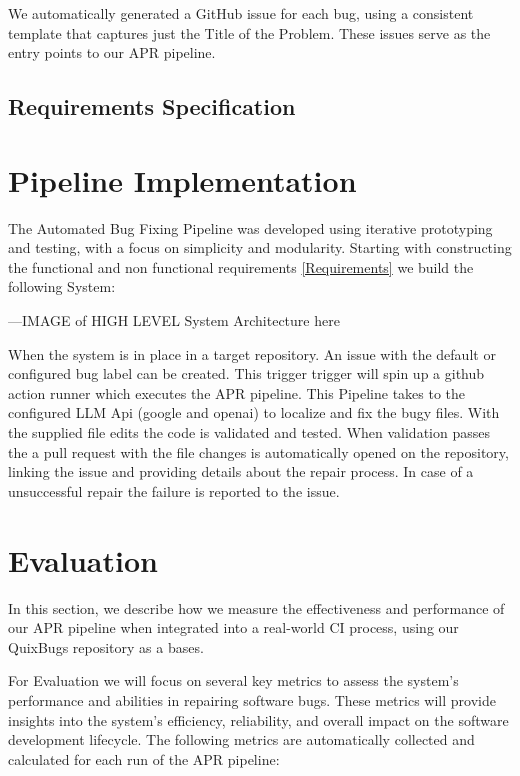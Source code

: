 We automatically generated a GitHub issue for each bug, using a consistent template that captures just the Title of the Problem. These issues serve as the entry points to our APR pipeline.

\subsection{Requirements Specification}

\section{Pipeline Implementation}
The Automated Bug Fixing Pipeline was developed using iterative prototyping and testing, with a focus on simplicity and modularity. Starting with constructing the functional and non functional requirements \ref{Requirements} we build the following System:

---IMAGE of HIGH LEVEL System Architecture here

When the system is in place in a target repository. An issue with the default or configured bug label can be created. This trigger trigger will spin up a github action runner which executes the APR pipeline. This Pipeline takes to the configured LLM Api (google and openai) to localize and fix the bugy files. With the supplied file edits the code is validated and tested. When validation passes the a pull request with the file changes is automatically opened on the repository, linking the issue and providing details about the repair process. In case of a unsuccessful repair the failure is reported to the issue.


\section{Evaluation}

In this section, we describe how we measure the effectiveness and performance of our APR pipeline when integrated into a real-world CI process, using our QuixBugs repository as a bases.

For Evaluation we will focus on several key metrics to assess the system's performance and abilities in repairing software bugs. These metrics will provide insights into the system's efficiency, reliability, and overall impact on the software development lifecycle. The following metrics are automatically collected and calculated for each run of the APR pipeline:


